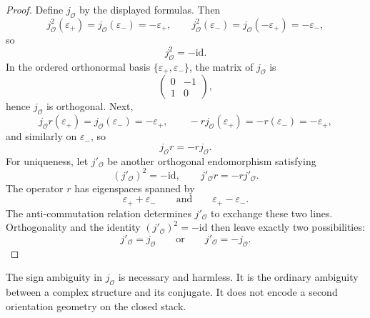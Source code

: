 \begin{proof}
	Define \(j_{\mathcal O}\) by the displayed formulas.
	Then
	\[
		j_{\mathcal O}^{2}(\varepsilon_{+})
		=
		j_{\mathcal O}(\varepsilon_{-})
		=
		-\varepsilon_{+},
		\qquad
		j_{\mathcal O}^{2}(\varepsilon_{-})
		=
		j_{\mathcal O}(-\varepsilon_{+})
		=
		-\varepsilon_{-},
	\]
	so
	\[
		j_{\mathcal O}^{2}=-\mathrm{id}.
	\]
	In the ordered orthonormal basis
	\(\{\varepsilon_{+},\varepsilon_{-}\}\), the matrix of \(j_{\mathcal O}\)
	is
	\[
		\begin{pmatrix}
			0 & -1 \\
			1 & 0
		\end{pmatrix},
	\]
	hence \(j_{\mathcal O}\) is orthogonal.
	Next,
	\[
		j_{\mathcal O}r(\varepsilon_{+})
		=
		j_{\mathcal O}(\varepsilon_{-})
		=
		-\varepsilon_{+},
		\qquad
		-rj_{\mathcal O}(\varepsilon_{+})
		=
		-r(\varepsilon_{-})
		=
		-\varepsilon_{+},
	\]
	and similarly on \(\varepsilon_{-}\), so
	\[
		j_{\mathcal O}r=-rj_{\mathcal O}.
	\]
	For uniqueness, let \(j'_{\mathcal O}\) be another orthogonal
	endomorphism satisfying
	\[
		(j'_{\mathcal O})^{2}=-\mathrm{id},
		\qquad
		j'_{\mathcal O}r=-rj'_{\mathcal O}.
	\]
	The operator \(r\) has eigenspaces spanned by
	\[
		\varepsilon_{+}+\varepsilon_{-}
		\qquad\text{and}\qquad
		\varepsilon_{+}-\varepsilon_{-}.
	\]
	The anti-commutation relation determines \(j'_{\mathcal O}\) to exchange
	these two lines.
	Orthogonality and the identity
	\((j'_{\mathcal O})^{2}=-\mathrm{id}\) then leave exactly two
	possibilities:
	\[
		j'_{\mathcal O}=j_{\mathcal O}
		\qquad\text{or}\qquad
		j'_{\mathcal O}=-j_{\mathcal O}.
	\]
\end{proof}
\begin{remark}
	The sign ambiguity in \(j_{\mathcal O}\) is necessary and harmless.
	It is the ordinary ambiguity between a complex structure and its
	conjugate.
	It does not encode a second orientation geometry on the closed stack.
\end{remark}
